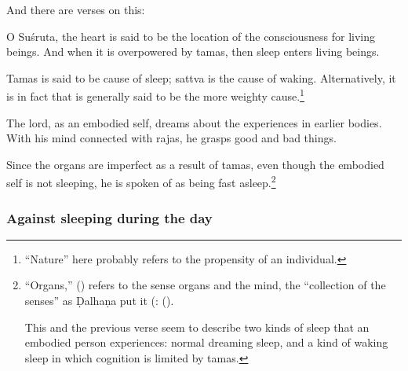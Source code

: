 \begin{translation}
\item[34]

And there are verses on this:

\begin{sloka}
O Suśruta, the heart is said to be the location of the
consciousness for living beings.  And when it is overpowered by tamas, then 
sleep enters living beings.
\end{sloka}

\item[35]

\begin{sloka}
Tamas is said to be cause of sleep; sattva is the cause of waking.
Alternatively, it is in fact  that is generally
said to be the more weighty cause.\footnote{ “Nature” here probably
    refers to the propensity of an individual.}
\end{sloka}

\item[36]

\begin{sloka}
The lord, as an embodied self, dreams about the experiences in earlier
bodies.  With his mind connected with rajas, he grasps good and bad
things.
\end{sloka}

\item[37]

 \begin{sloka}
Since the organs are imperfect as a result of tamas, even though
the embodied self is not sleeping, he is spoken of as being fast
asleep.\footnote{“Organs,” () refers to the sense organs
    and the mind, the “{collection of the senses}” as Ḍalhaṇa put it
    (:  (). 
    
    This and the previous verse seem to describe two kinds of sleep
that an embodied person experiences: normal dreaming sleep, and a
kind of waking sleep in which cognition is limited by tamas.}
 \end{sloka}

\subsubsection{Against sleeping during the day}

\item[38]


\end{translation}
